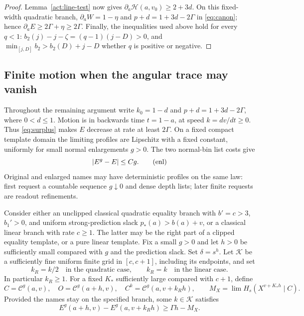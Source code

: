 \begin{proof}
Lemma~\ref{act:line-test} now gives
$\partial_a\mathcal H(a,v_0)\ge2+3d$.  On this fixed-width
quadratic branch, $\partial_a W=1-\eta$ and
$p+d=1+3d-2\Gamma$ in \eqref{eq:canon}; hence
$\partial_a E\ge2\Gamma+\eta\ge2\Gamma$.
Finally, the inequalities used above hold for every $q<1$:
$b_2(j)-j-\zeta=(q-1)(j-D)>0$, and
$\min_{[j,D]}b_2>b_2(D)+j-D$ whether $q$ is positive or negative.
\end{proof}

\subsection{Finite motion when the angular trace may vanish}

Throughout the remaining argument write $k_0=1-d$ and
$p+d=1+3d-2\Gamma$, where $0<d\le1$.  Motion is in backwards
time $t=1-a$, at speed $k=dv/dt\ge0$.  Thus
\eqref{eq:surplus} makes $E$ decrease at rate at least $2\Gamma$.
On a fixed compact template domain the limiting profiles are
Lipschitz with a fixed constant, uniformly for small normal
enlargements $g>0$.  The two normal-bin list costs give
\begin{equation}
 \lvert E^g-E\rvert\le Cg.
 \tag{enl}\label{eq:enl}
\end{equation}
Original and enlarged names may have deterministic profiles on
the same law: first request a countable sequence $g\downarrow0$
and dense depth lists; later finite requests are readout refinements.

\begin{lemma}\label{act:finite-step}
Consider either an unclipped classical quadratic equality branch
with $b'=c>3$, $b_1'>0$, and uniform strong-prediction slack
$p_*(a)>b(a)+v$, or a classical linear branch with rate $c\ge1$.
The latter may be the right part of a clipped equality template,
or a pure linear template.  Fix a small $g>0$ and let $h>0$ be
sufficiently small compared with $g$ and the prediction slack.
Set $\delta=s^h$.  Let $\mathcal K$ be a sufficiently fine uniform
finite grid in $[c,c+1]$, including its endpoints, and set
\[
 k_R=k/2\quad\text{in the quadratic case},\qquad
 k_R=k\quad\text{in the linear case}.
\]
In particular $k_R\ge1$.  For a fixed $K_*$ sufficiently large
compared with $c+1$, define
\[
 C=\mathcal C^g(a,v),\quad O=\mathcal C^g(a+h,v),\quad
 C^k=\mathcal C^g(a,v+k_Rh),\qquad
 M_X=\lim H_s(X^{v+K_*h}\mid C).
\]
Provided the names stay on the specified branch, some $k\in\mathcal K$
satisfies
\begin{equation}
 E^g(a+h,v)-E^g(a,v+k_Rh)\ge\Gamma h-M_X.
 \tag{step}\label{eq:step}
\end{equation}
\end{lemma}

